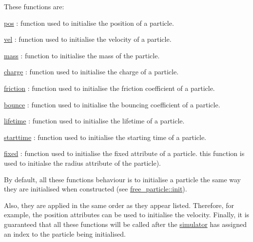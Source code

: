 These functions are\+:
\begin{DoxyItemize}
\item \hyperlink{classphysim_1_1emitters_1_1base__emitter_ac67584a2ca34232c1f4f04c41599df0e}{pos} \+: function used to initialise the position of a particle.
\item \hyperlink{classphysim_1_1emitters_1_1base__emitter_a9ea19d96450cff65882371b61a2294c8}{vel} \+: function used to initialise the velocity of a particle.
\item \hyperlink{classphysim_1_1emitters_1_1base__emitter_a4e1b65730afef86899544d3306f7547d}{mass} \+: function to initialise the mass of the particle.
\item \hyperlink{classphysim_1_1emitters_1_1free__emitter_a895244d2023c4cc72658d356bdb51b9a}{charge} \+: function used to initialise the charge of a particle.
\item \hyperlink{classphysim_1_1emitters_1_1free__emitter_a0167889dfac9483e7e2690efc353a7bd}{friction} \+: function used to initialise the friction coefficient of a particle.
\item \hyperlink{classphysim_1_1emitters_1_1free__emitter_a71006743e284b12904d7a4b4127ab4b8}{bounce} \+: function used to initialise the bouncing coefficient of a particle.
\item \hyperlink{classphysim_1_1emitters_1_1free__emitter_a596108fe3602299fa9035ece668653d4}{lifetime} \+: function used to initialise the lifetime of a particle.
\item \hyperlink{classphysim_1_1emitters_1_1free__emitter_af296f735438087c4acaba2242c839e49}{starttime} \+: function used to initialise the starting time of a particle.
\item \hyperlink{classphysim_1_1emitters_1_1free__emitter_a2561dbe073b699e28fbb7ad10e897567}{fixed} \+: function used to initialise the fixed attribute of a particle. this function is used to initialse the radius attribute of the particle).
\end{DoxyItemize}

By default, all these function\textquotesingle{}s behaviour is to initialise a particle the same way they are initialised when constructed (see \hyperlink{classphysim_1_1particles_1_1free__particle_a0df21e64a28c5fdf471d54a50b59fea3}{free\+\_\+particle\+::init}).

Also, they are applied in the same order as they appear listed. Therefore, for example, the position attributes can be used to initialise the velocity. Finally, it is guaranteed that all these functions will be called after the \hyperlink{classphysim_1_1simulator}{simulator} has assigned an index to the particle being initialised.

